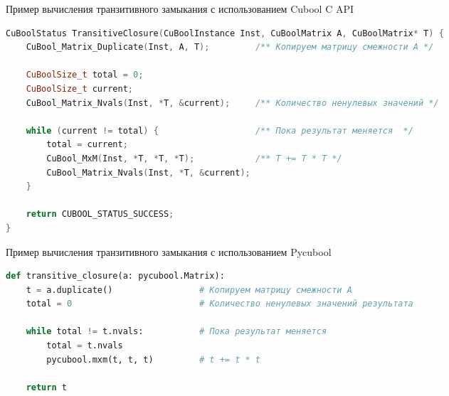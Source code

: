 \begin{algorithm}[h]
\caption{Пример вычисления транзитивного замыкания с использованием Cubool C API}
\label{alg:cubool_example}
\begin{lstlisting}[language=C++]
CuBoolStatus TransitiveClosure(CuBoolInstance Inst, CuBoolMatrix A, CuBoolMatrix* T) {
    CuBool_Matrix_Duplicate(Inst, A, T);         /** Копируем матрицу смежности А */

    CuBoolSize_t total = 0;
    CuBoolSize_t current;
    CuBool_Matrix_Nvals(Inst, *T, &current);     /** Количество ненулевых значений */

    while (current != total) {                   /** Пока результат меняется  */
        total = current;
        CuBool_MxM(Inst, *T, *T, *T);            /** T += T * T */
        CuBool_Matrix_Nvals(Inst, *T, &current);
    }

    return CUBOOL_STATUS_SUCCESS;
}
\end{lstlisting}
\end{algorithm}

\begin{algorithm}[h]
\caption{Пример вычисления транзитивного замыкания с использованием Pycubool}
\label{alg:pycubool_example}
\begin{lstlisting}[language=Python]
def transitive_closure(a: pycubool.Matrix):
    t = a.duplicate()                 # Копируем матрицу смежности А
    total = 0                         # Количество ненулевых значений результата

    while total != t.nvals:           # Пока результат меняется
        total = t.nvals
        pycubool.mxm(t, t, t)         # t += t * t

    return t
\end{lstlisting}
\end{algorithm}